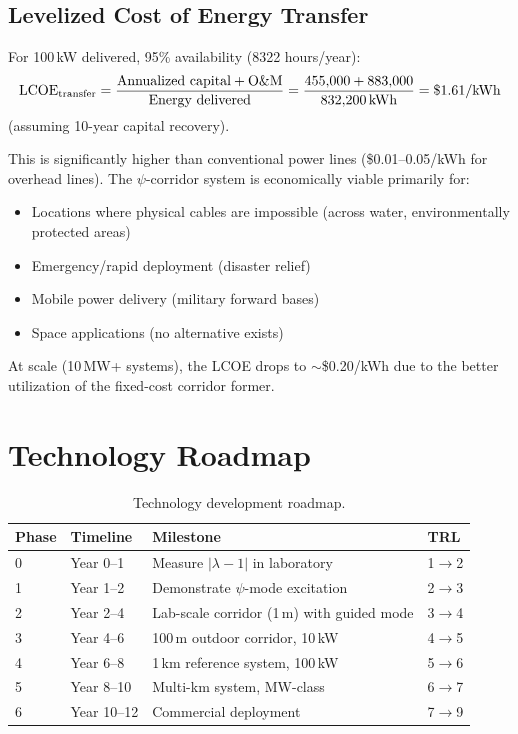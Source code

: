 \documentclass[11pt,a4paper]{article}
\begin{document}
\subsection{Levelized Cost of Energy Transfer}

For 100\,kW delivered, 95\% availability (8322 hours/year):
\begin{equation}
\text{LCOE}_{\rm transfer} = \frac{\text{Annualized capital} + \text{O\&M}}
{\text{Energy delivered}} = \frac{455{,}000 + 883{,}000}{832{,}200\,\text{kWh}}
= \$1.61/\text{kWh}
\end{equation}
(assuming 10-year capital recovery).

This is significantly higher than conventional power lines (\$0.01--0.05/kWh
for overhead lines). The $\psi$-corridor system is economically viable
primarily for:
\begin{itemize}
\item Locations where physical cables are impossible (across water,
environmentally protected areas)
\item Emergency/rapid deployment (disaster relief)
\item Mobile power delivery (military forward bases)
\item Space applications (no alternative exists)
\end{itemize}

At scale (10\,MW+ systems), the LCOE drops to $\sim$\$0.20/kWh due to
the better utilization of the fixed-cost corridor former.

\section{Technology Roadmap}

\begin{table}[h]
\centering
\caption{Technology development roadmap.}
\begin{tabular}{llll}
\toprule
Phase & Timeline & Milestone & TRL \\
\midrule
0 & Year 0--1 & Measure $|\lambda - 1|$ in laboratory & 1$\to$2 \\
1 & Year 1--2 & Demonstrate $\psi$-mode excitation & 2$\to$3 \\
2 & Year 2--4 & Lab-scale corridor (1\,m) with guided mode & 3$\to$4 \\
3 & Year 4--6 & 100\,m outdoor corridor, 10\,kW & 4$\to$5 \\
4 & Year 6--8 & 1\,km reference system, 100\,kW & 5$\to$6 \\
5 & Year 8--10 & Multi-km system, MW-class & 6$\to$7 \\
6 & Year 10--12 & Commercial deployment & 7$\to$9 \\
\bottomrule
\end{tabular}
\end{table}
\end{document}
